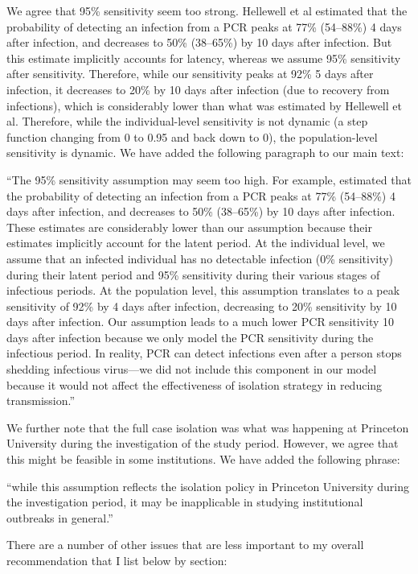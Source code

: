 \documentclass[12pt]{article}
\newcommand{\revtext}{\textsf}
\begin{document}
We agree that 95\% sensitivity seem too strong.
Hellewell et al estimated that the probability of detecting an infection from a PCR peaks at 77\% (54–88\%) 4 days after infection, and decreases to 50\% (38–65\%) by 10 days after infection.
But this estimate implicitly accounts for latency, whereas we assume 95\% sensitivity after sensitivity.
Therefore, while our sensitivity peaks at 92\% 5 days after infection, it decreases to 20\% by 10 days after infection (due to recovery from infections), which is considerably lower than what was estimated by Hellewell et al.
Therefore, while the individual-level sensitivity is not dynamic (a step function changing from 0 to 0.95 and back down to 0), the population-level sensitivity is dynamic.
We have added the following paragraph to our main text:

``The 95\% sensitivity assumption may seem too high. 
For example, \cite{hellewell2021estimating} estimated that the probability of detecting an infection from a PCR peaks at 77\% (54–88\%) 4 days after infection, and decreases to 50\% (38–65\%) by 10 days after infection.
These estimates are considerably lower than our assumption because their estimates implicitly account for the latent period.
At the individual level, we assume that an infected individual has no detectable infection (0\% sensitivity) during their latent period and 95\% sensitivity during their various stages of infectious periods.
At the population level, this assumption translates to a peak sensitivity of 92\% by 4 days after infection, decreasing to 20\% sensitivity by 10 days after infection.
Our assumption leads to a much lower PCR sensitivity 10 days after infection because we only model the PCR sensitivity during the infectious period.
In reality, PCR can detect infections even after a person stops shedding infectious virus---we did not include this component in our model because it would not affect the effectiveness of isolation strategy in reducing transmission.''

We further note that the full case isolation was what was happening at Princeton University during the investigation of the study period.
However, we agree that this might be feasible in some institutions. We have added the following phrase:

``while this assumption reflects the isolation policy in Princeton University during the investigation period, it may be inapplicable in studying institutional outbreaks in general.''

\revtext{There are a number of other issues that are less important to my overall recommendation that I list below by section:}
\end{document}
